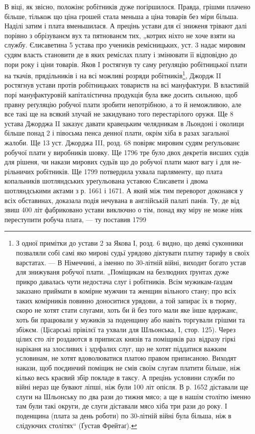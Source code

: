 В  віці, як звісно, положінє робітників дуже погіршилося.
Правда, грішми плачено більше, тількож що ціна
грошей стала меньша а ціна товарів без міри більша. Наділі
затим і плата вменьшилася. А прецінь устави для єї
зниженя трівают далі порівно з обрізуванєм вух та пятнованєм
тих, „котрих ніхто не хоче взяти на службу. Єлисаветина
5 устава про учеників ремісницьких, уст. 3 надає
мировим судям власть становити де в яких реміслах плату
і змінювати її відповідно до пори року і ціни товарів. Яков
I ростягнув ту саму реґуляцію робітницької плати на ткачів,
прядільників і на всі можливі розряди робітників\footnote{
З одної примітки до устави 2 за Якова І, розд. 6 видно, що
деякі суконники позваляли собі самі яко мирові судьї урядово діктувати
платну тарифу в своїх варстатах. — В Німеччині, а іменно по 30-літній
війні, виходит богато устав для знижуваня робучої плати. „Поміщикам
на безлюдних ґрунтах дуже прикро давалась чути недостача слуг і робітників.
Всім мужикам-ґаздам заказано приймати в комірне мужчин та
женщин вільного стану; про всіх таких комірників повинно доноситися
урядови, а той запирає їх в тюрму, скоро не хотят стати слугами, хоть би
й без того мали яке їнше вдержанє, хоть би працювали у  мужиків за поденщину
або навіть торгували грішми та збіжєм. (Цісарські прівілєї та
ухвали для Шльонська, І, стор. 125). Через цілих сто літ роздаются в приписах
князів та поміщиків раз~відразу гіркі наріканя на злосливих
і здуфалих слуг, що не хотят піддатися важким условинам, не хотят вдоволюватися
платою правом приписаною. Виходят накази, щоб поєдинчий
поміщик не смів своїм слугам платити більше, ніж кілько весь краєвий
збір покладе в таксу. А прецінь условини служби по війні нераз ще
бувают ліпші, ніж були 100 літ опісля. В р. 1652 діставали ще слуги на
Шльонську по два рази до тижня мясо; а ще в нашім столітю іменно
там були такі округи, де слуги діставали мясо хіба три рази до року.
І поденщина (плата за день роботи) по 30-літній війні була більша, ніж
в слідуючих столітях“ (Ґустав Фрейтаґ).
}, Джордж
II ростягнув устави протів робітницьких товариств на всі
мануфактури. В властивій порі мануфактуровій капіталістична
продукція була вже досить сильною, щоб правну
реґуляцію робучої плати зробити непотрібною, а то й неможливою,
але все такі ще на всякий злучай не закидувано
того перестарілого оружя. Ще 8 устава Джорджа II заказує
давати кравецьким челядникам в Льондоні і околици більше
понад 2 і півосьма пенса денної плати, окрім хіба
в разах загальної жалоби. Ще 13 уст. Джорджа III, розд.
68 повіряє мировим судям реґульованє робучої плати у виробників
шовку. Ще 1796 тре було двох декретів висших
судів для рішеня, чи накази мирових судьїв що до робучої
плати мают вагу і для не-рільничих робітників. Ще 1799
потвердила ухвала парляменту, що плата копальників шотляндських
уреґульована уставою Єлисавети і двома шотляндськими
актами з р. 1661 і 1671. А який між тим переворот
доконався у всіх обставинах, доказала подія нечувана
в англійській палаті панів. Ту, де від звиш 400 літ
фабриковано устави виключно о тім, понад яку міру не
може ніяк переступити робуча плата, — ту поставив 1799
\parbreak{}

